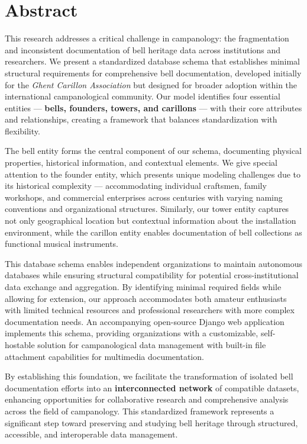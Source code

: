 \documentclass[11pt, a4paper]{article}
\begin{document}
\section{Abstract}

This research addresses a critical challenge in campanology: the fragmentation and inconsistent documentation of bell heritage data across institutions and researchers. We present a standardized database schema that establishes minimal structural requirements for comprehensive bell documentation, developed initially for the \textit{Ghent Carillon Association} but designed for broader adoption within the international campanological community. Our model identifies four essential entities — \textbf{bells, founders, towers, and carillons} — with their core attributes and relationships, creating a framework that balances standardization with flexibility.

The bell entity forms the central component of our schema, documenting physical properties, historical information, and contextual elements. We give special attention to the founder entity, which presents unique modeling challenges due to its historical complexity — accommodating individual craftsmen, family workshops, and commercial enterprises across centuries with varying naming conventions and organizational structures. Similarly, our tower entity captures not only geographical location but contextual information about the installation environment, while the carillon entity enables documentation of bell collections as functional musical instruments.

This database schema enables independent organizations to maintain autonomous databases while ensuring structural compatibility for potential cross-institutional data exchange and aggregation. By identifying minimal required fields while allowing for extension, our approach accommodates both amateur enthusiasts with limited technical resources and professional researchers with more complex documentation needs. An accompanying open-source Django web application implements this schema, providing organizations with a customizable, self-hostable solution for campanological data management with built-in file attachment capabilities for multimedia documentation.

By establishing this foundation, we facilitate the transformation of isolated bell documentation efforts into an \textbf{interconnected network} of compatible datasets, enhancing opportunities for collaborative research and comprehensive analysis across the field of campanology. This standardized framework represents a significant step toward preserving and studying bell heritage through structured, accessible, and interoperable data management.
\end{document}
